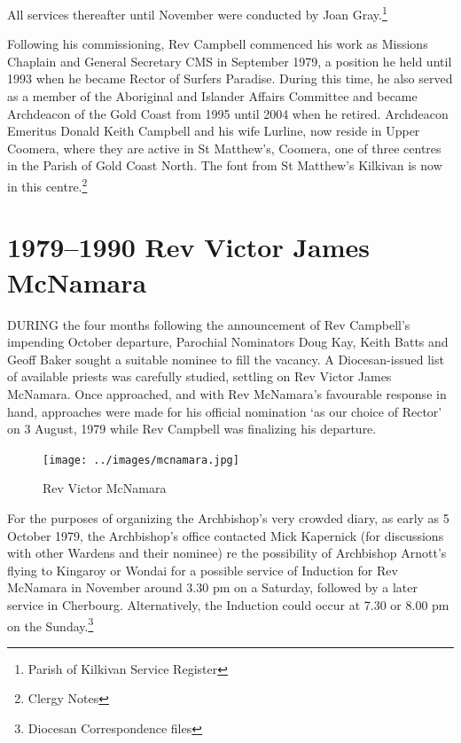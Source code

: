 All services thereafter until November were conducted by Joan Gray.\footnote{Parish of Kilkivan Service Register}


Following his commissioning, Rev Campbell commenced his work as Missions Chaplain and General Secretary CMS in September 1979, a position he held until 1993 when he became Rector of Surfers Paradise. During this time, he also served as a member of the Aboriginal and Islander Affairs Committee and became Archdeacon of the Gold Coast from 1995 until 2004 when he retired. Archdeacon Emeritus Donald Keith Campbell and his wife Lurline, now reside in Upper Coomera, where they are active in St Matthew's, Coomera, one of three centres in the Parish of Gold Coast North. The font from St Matthew's Kilkivan is now in this centre.\footnote{Clergy Notes}


\balance


\printendnotes[custom]
\setcounter{endnote}{0}
\chapter{1979--1990 Rev Victor James McNamara}
\nobalance


\lettrine[lines=3]{D}{URING}
 the four months following the announcement of Rev Campbell's impending October departure, Parochial Nominators Doug Kay, Keith Batts and Geoff Baker sought a suitable nominee to fill the vacancy. A Diocesan-issued list of available priests was carefully studied, settling on Rev Victor James McNamara. Once approached, and with Rev McNamara's favourable response in hand, approaches were made for his official nomination `as our choice of Rector' on 3 August, 1979 while Rev Campbell was finalizing his departure.







\begin{figure}
\begin{center}
\texttt{[image: ../images/mcnamara.jpg]}
\caption{Rev Victor McNamara}
\end{center}
\end{figure}




For the purposes of organizing the Archbishop's very crowded diary, as early as 5 October 1979, the Archbishop's office contacted Mick Kapernick (for discussions with other Wardens and their nominee) re the possibility of Archbishop Arnott's flying to Kingaroy or Wondai for a possible service of Induction for Rev McNamara in November around 3.30 pm on a Saturday, followed by a later service in Cherbourg. Alternatively, the Induction could occur at 7.30 or 8.00 pm on the Sunday.\footnote{Diocesan Correspondence files}


